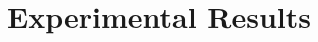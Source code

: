 \renewcommand{\vec}[1]{\textbf{#1}}

\chapter{Experimental Results}
\label{cha:experimental_results}
